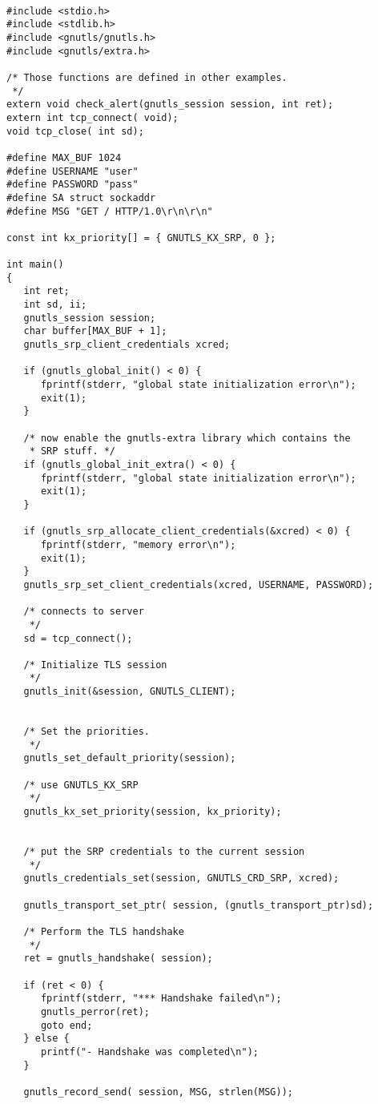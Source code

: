 \begin{verbatim}

#include <stdio.h>
#include <stdlib.h>
#include <gnutls/gnutls.h>
#include <gnutls/extra.h>

/* Those functions are defined in other examples.
 */
extern void check_alert(gnutls_session session, int ret);
extern int tcp_connect( void);
void tcp_close( int sd);

#define MAX_BUF 1024
#define USERNAME "user"
#define PASSWORD "pass"
#define SA struct sockaddr
#define MSG "GET / HTTP/1.0\r\n\r\n"

const int kx_priority[] = { GNUTLS_KX_SRP, 0 };

int main()
{
   int ret;
   int sd, ii;
   gnutls_session session;
   char buffer[MAX_BUF + 1];
   gnutls_srp_client_credentials xcred;

   if (gnutls_global_init() < 0) {
      fprintf(stderr, "global state initialization error\n");
      exit(1);
   }

   /* now enable the gnutls-extra library which contains the
    * SRP stuff. */
   if (gnutls_global_init_extra() < 0) {
      fprintf(stderr, "global state initialization error\n");
      exit(1);
   }

   if (gnutls_srp_allocate_client_credentials(&xcred) < 0) {
      fprintf(stderr, "memory error\n");
      exit(1);
   }
   gnutls_srp_set_client_credentials(xcred, USERNAME, PASSWORD);

   /* connects to server 
    */
   sd = tcp_connect();

   /* Initialize TLS session 
    */
   gnutls_init(&session, GNUTLS_CLIENT);


   /* Set the priorities.
    */
   gnutls_set_default_priority(session);
 
   /* use GNUTLS_KX_SRP
    */
   gnutls_kx_set_priority(session, kx_priority);
 

   /* put the SRP credentials to the current session
    */
   gnutls_credentials_set(session, GNUTLS_CRD_SRP, xcred);

   gnutls_transport_set_ptr( session, (gnutls_transport_ptr)sd);

   /* Perform the TLS handshake
    */
   ret = gnutls_handshake( session);

   if (ret < 0) {
      fprintf(stderr, "*** Handshake failed\n");
      gnutls_perror(ret);
      goto end;
   } else {
      printf("- Handshake was completed\n");
   }

   gnutls_record_send( session, MSG, strlen(MSG));


\end{verbatim}
